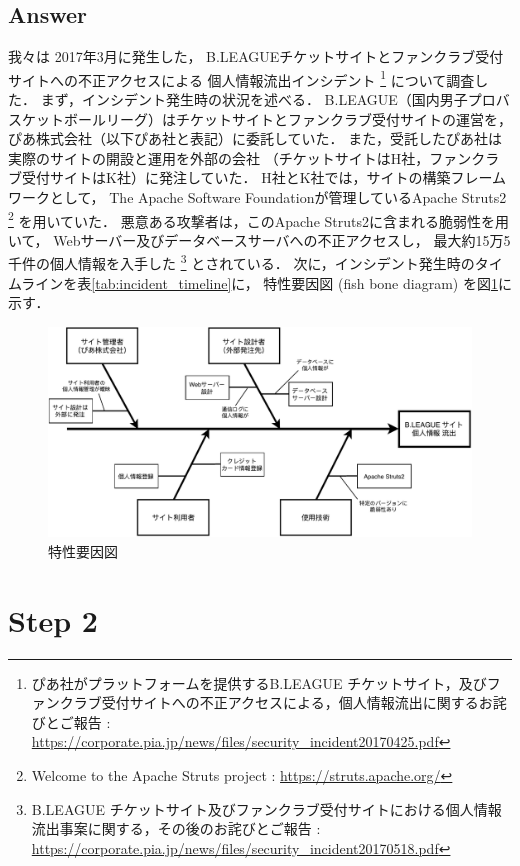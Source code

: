 \documentclass[uplatex]{jsarticle}
\begin{document}
\subsection*{Answer}
我々は 2017年3月に発生した，
B.LEAGUEチケットサイトとファンクラブ受付サイトへの不正アクセスによる
個人情報流出インシデント
\footnote{
    ぴあ社がプラットフォームを提供するB.LEAGUE チケットサイト，及びファンクラブ受付サイトへの不正アクセスによる，個人情報流出に関するお詫びとご報告
    : \url{https://corporate.pia.jp/news/files/security_incident20170425.pdf}
}
について調査した．
まず，インシデント発生時の状況を述べる．
B.LEAGUE（国内男子プロバスケットボールリーグ）はチケットサイトとファンクラブ受付サイトの運営を，
ぴあ株式会社（以下ぴあ社と表記）に委託していた．
また，受託したぴあ社は実際のサイトの開設と運用を外部の会社
（チケットサイトはH社，ファンクラブ受付サイトはK社）に発注していた．
H社とK社では，サイトの構築フレームワークとして，
The Apache Software Foundationが管理しているApache Struts2
\footnote{
    Welcome to the Apache Struts project
    : \url{https://struts.apache.org/}
}
を用いていた．
悪意ある攻撃者は，このApache Struts2に含まれる脆弱性を用いて，
Webサーバー及びデータベースサーバへの不正アクセスし，
最大約15万5千件の個人情報を入手した
\footnote{
    B.LEAGUE チケットサイト及びファンクラブ受付サイトにおける個人情報流出事案に関する，その後のお詫びとご報告
    : \url{https://corporate.pia.jp/news/files/security_incident20170518.pdf}
}
とされている．
次に，インシデント発生時のタイムラインを表\ref{tab:incident_timeline}に，
特性要因図 (fish bone diagram) を図\ref{fig:fishbone}に示す．



\begin{figure}[htbp]
    \centering
    \includegraphics[width=0.8\linewidth]{pic/fishbone-GroupA.pdf}
    \caption{特性要因図}
    \label{fig:fishbone}
\end{figure}

\section*{Step 2}
\end{document}
